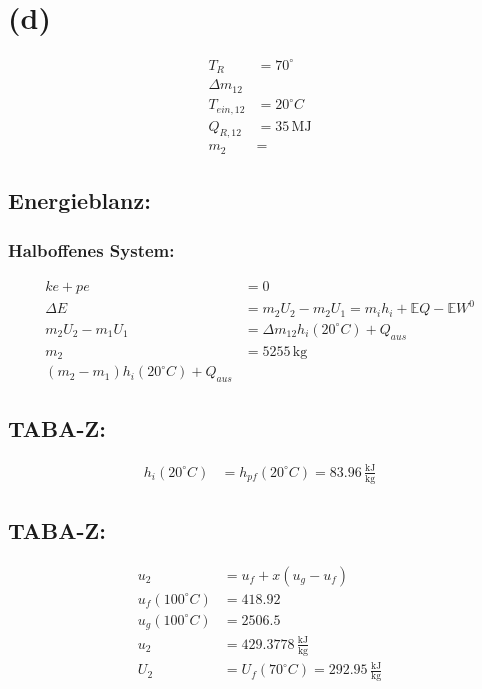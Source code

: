 

\section*{(d)}

\begin{align*}
T_R &= 70^\circ \\
\Delta m_{12} \\
T_{ein,12} &= 20^\circ C \\
Q_{R,12} &= 35 \, \text{MJ} \\
m_2 &= 
\end{align*}

\subsection*{Energieblanz:}

\subsubsection*{Halboffenes System:}
\begin{align*}
ke + pe &= 0 \\
\Delta E &= m_2 U_2 - m_2 U_1 = m_i h_i + \mathbb{E} Q - \mathbb{E} W^0 \\
m_2 U_2 - m_1 U_1 &= \Delta m_{12} h_i (20^\circ C) + Q_{aus} \\
m_2 &= 5255 \, \text{kg} \\
(m_2 - m_1) h_i (20^\circ C) + Q_{aus}
\end{align*}

\subsection*{TABA-Z:}
\begin{align*}
h_i (20^\circ C) &= h_{pf} (20^\circ C) = 83.96 \, \frac{\text{kJ}}{\text{kg}}
\end{align*}

\subsection*{TABA-Z:}
\begin{align*}
u_2 &= u_f + x (u_g - u_f) \\
u_f (100^\circ C) &= 418.92 \\
u_g (100^\circ C) &= 2506.5 \\
u_2 &= 429.3778 \, \frac{\text{kJ}}{\text{kg}} \\
U_2 &= U_f (70^\circ C) = 292.95 \, \frac{\text{kJ}}{\text{kg}}
\end{align*}

